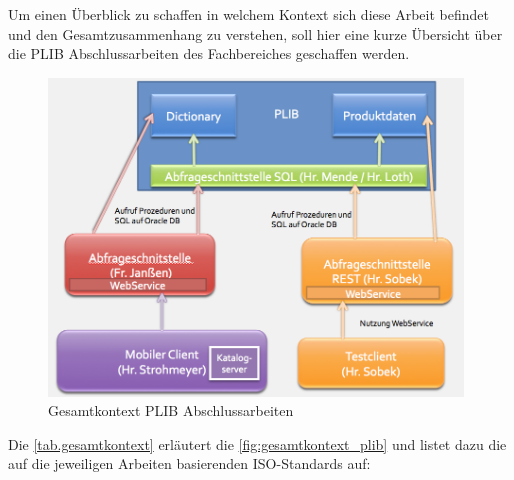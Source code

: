 Um einen Überblick zu schaffen in welchem Kontext sich diese Arbeit befindet und den Gesamtzusammenhang zu verstehen, soll hier eine kurze Übersicht über die PLIB Abschlussarbeiten des Fachbereiches geschaffen werden. 


\begin{figure}[htbp]
	\centering
		\includegraphics[width=0.98\textwidth]{images/gesamtkontext_plib.png}
	\caption{Gesamtkontext PLIB Abschlussarbeiten}
	\label{fig:gesamtkontext_plib}
\end{figure}

Die \autoref{tab.gesamtkontext} erläutert die \autoref{fig:gesamtkontext_plib} und listet dazu die auf die jeweiligen Arbeiten basierenden ISO-Standards auf: 


